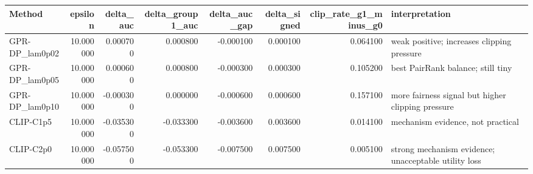 \begin{tabular}{lrrrrrrl}
\toprule
Method & epsilon & delta_auc & delta_group1_auc & delta_auc_gap & delta_signed & clip_rate_g1_minus_g0 & interpretation \\
\midrule
GPR-DP_lam0p02 & 10.000000 & 0.000700 & 0.000800 & -0.000100 & 0.000100 & 0.064100 & weak positive; increases clipping pressure \\
GPR-DP_lam0p05 & 10.000000 & 0.000600 & 0.000800 & -0.000300 & 0.000300 & 0.105200 & best PairRank balance; still tiny \\
GPR-DP_lam0p10 & 10.000000 & -0.000300 & 0.000000 & -0.000600 & 0.000600 & 0.157100 & more fairness signal but higher clipping pressure \\
CLIP-C1p5 & 10.000000 & -0.035300 & -0.033300 & -0.003600 & 0.003600 & 0.014100 & mechanism evidence, not practical \\
CLIP-C2p0 & 10.000000 & -0.057500 & -0.053300 & -0.007500 & 0.007500 & 0.005100 & strong mechanism evidence; unacceptable utility loss \\
\bottomrule
\end{tabular}
